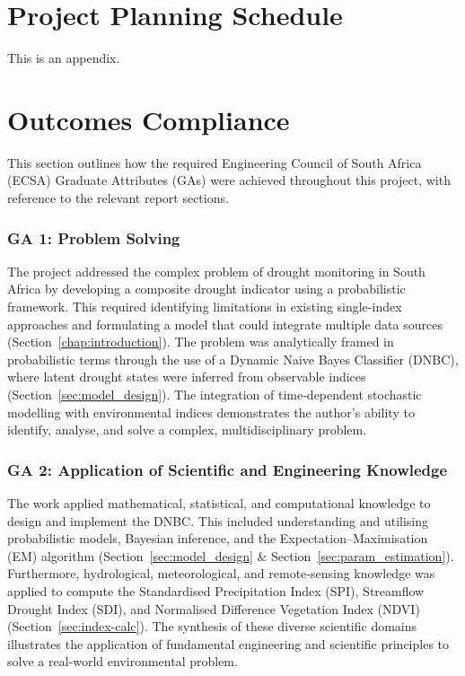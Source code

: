 \chapter{Project Planning Schedule}
\makeatletter{}\makeatother
\label{appen:derivations_bigramseg}

This is an appendix.

\chapter{Outcomes Compliance}
\makeatletter{}\makeatother
\label{appen:derivations_bigramseg}

This section outlines how the required Engineering Council of South Africa (ECSA) Graduate Attributes (GAs) were achieved throughout this project, with reference to the relevant report sections.

\subsection*{GA 1: Problem Solving}
The project addressed the complex problem of drought monitoring in South Africa by developing a composite drought indicator using a probabilistic framework. This required identifying limitations in existing single-index approaches and formulating a model that could integrate multiple data sources (Section~\ref{chap:introduction}). The problem was analytically framed in probabilistic terms through the use of a Dynamic Naive Bayes Classifier (DNBC), where latent drought states were inferred from observable indices (Section~\ref{sec:model_design}). The integration of time‐dependent stochastic modelling with environmental indices demonstrates the author’s ability to identify, analyse, and solve a complex, multidisciplinary problem.

\subsection*{GA 2: Application of Scientific and Engineering Knowledge}
The work applied mathematical, statistical, and computational knowledge to design and implement the DNBC. This included understanding and utilising probabilistic models, Bayesian inference, and the Expectation–Maximisation (EM) algorithm (Section~\ref{sec:model_design} \& Section~\ref{sec:param_estimation}). Furthermore, hydrological, meteorological, and remote‐sensing knowledge was applied to compute the Standardised Precipitation Index (SPI), Streamflow Drought Index (SDI), and Normalised Difference Vegetation Index (NDVI) (Section~\ref{sec:index-calc}). The synthesis of these diverse scientific domains illustrates the application of fundamental engineering and scientific principles to solve a real‐world environmental problem.

